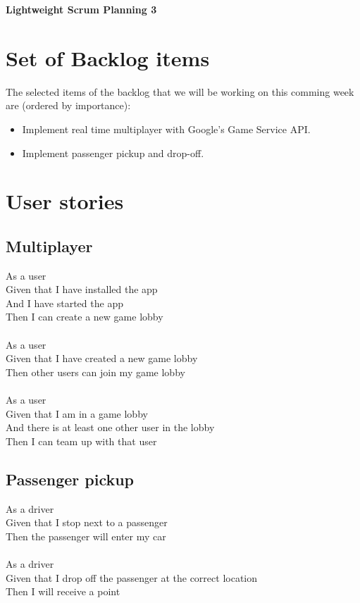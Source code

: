 \documentclass{article}
\begin{document}
\begin{minipage}[H]{\textwidth}
\vspace{0.3cm}
		\begin{center}
		\vspace{0.3cm}
			\Huge{\textbf{Lightweight Scrum Planning 3}}\\
		\vspace{0.3cm}	
		\vspace{0.7cm}		
		\end{center}
	\end{minipage}

\section*{Set of Backlog items}
The selected items of the backlog that we will be working on this comming week  are (ordered by importance):
\begin{itemize}
	\item Implement real time multiplayer with Google's Game Service API.
	\item Implement passenger pickup and drop-off.
\end{itemize}

\section*{User stories}
\subsection*{Multiplayer}
As a user\\
Given that I have installed the app\\
And I have started the app\\
Then I can create a new game lobby\\\\
As a user\\
Given that I have created a new game lobby\\
Then other users can join my game lobby\\\\
As a  user\\
Given that I am in a game lobby\\
And there is at least one other user in the lobby\\
Then I can team up with that user
\subsection*{Passenger pickup}
As a driver\\
Given that I stop next to a passenger\\
Then the passenger will enter my car\\\\
As a driver\\
Given that I drop off the passenger at the correct location\\
Then I will receive a point
\end{document}
